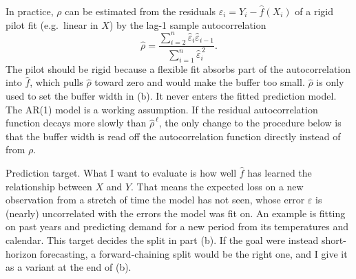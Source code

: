 \documentclass[12pt,letterpaper, onecolumn]{exam}
\begin{document}
\begin{questions}
\begin{solution}
\begin{enumerate}[(a)]
            In practice, $\rho$ can be estimated from the residuals $\hat\varepsilon_i = Y_i - \hat f(X_i)$ of a rigid pilot fit (e.g.\ linear in $X$) by the lag-1 sample autocorrelation
            \begin{equation*}
                \hat\rho = \frac{\sum_{i=2}^{n}\hat\varepsilon_i\hat\varepsilon_{i-1}}{\sum_{i=1}^{n}\hat\varepsilon_i^{\,2}}.
            \end{equation*}
            The pilot should be rigid because a flexible fit absorbs part of the autocorrelation into $\hat f$, which pulls $\hat\rho$ toward zero and would make the buffer too small. $\hat\rho$ is only used to set the buffer width in (b). It never enters the fitted prediction model. The AR(1) model is a working assumption. If the residual autocorrelation function decays more slowly than $\hat\rho^{\,\ell}$, the only change to the procedure below is that the buffer width is read off the autocorrelation function directly instead of from $\rho$.

            Prediction target. What I want to evaluate is how well $\hat f$ has learned the relationship between $X$ and $Y$. That means the expected loss on a new observation from a stretch of time the model has not seen, whose error $\varepsilon$ is (nearly) uncorrelated with the errors the model was fit on. An example is fitting on past years and predicting demand for a new period from its temperatures and calendar. This target decides the split in part (b). If the goal were instead short-horizon forecasting, a forward-chaining split would be the right one, and I give it as a variant at the end of (b).


\end{enumerate}
\end{solution}
\end{questions}
\end{document}
